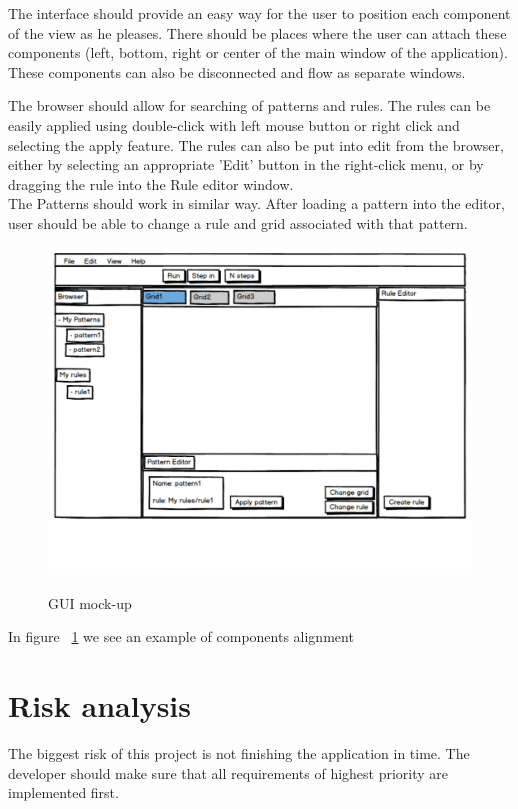 \documentclass{article}
\begin{document}
	The interface should provide an easy way for the user to position each component of the view as he pleases.
	There should be places where the user can attach these components (left, bottom, right or center of the main window of the application).
	These components can also be disconnected and flow as separate windows.
	
	The browser should allow for searching of patterns and rules.
	The rules can be easily applied using double-click with left mouse button
	or right click and selecting the apply feature.
	The rules can also be put into edit from the browser, either by selecting an
	appropriate 'Edit' button in the right-click menu, or by dragging the rule into the
	Rule editor window. \\
	The Patterns should work in similar way. After loading a pattern into the editor, user should be able to change a rule and grid associated with that pattern.
	

	\begin{figure}[h!]
	  \caption{GUI mock-up}
		\includegraphics[page=1,width=1.5\textwidth, center]{images/gui_mockup.pdf}
	  \label{fig:gui}
	\end{figure}

	In figure ~\ref{fig:gui} we see an example of components alignment
	

\section{Risk analysis}

The biggest risk of this project is not finishing the application in time.
The developer should make sure that all requirements of highest priority are implemented
first.
\end{document}
